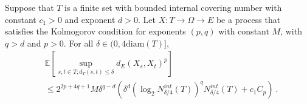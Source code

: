 \begin{theorem}\label{thm:finite_set_bound_of_dist_le_of_le_diam}
  \leanok
Suppose that $T$ is a finite set with bounded internal covering number with constant $c_1>0$ and exponent $d > 0$.
Let $X : T \to \Omega \to E$ be a process that satisfies the Kolmogorov condition for exponents $(p,q)$ with constant $M$, with $q > d$ and $p > 0$.
For all $\delta \in (0, 4\mathrm{diam}(T)]$,
\begin{align*}
  &\mathbb{E}\left[ \sup_{s, t \in T; d_T(s, t) \le \delta} d_E(X_s, X_t)^p \right]
  \\
  &\le 2^{2p+4q+1} M \delta^{q-d} \left(\delta^d \left(\log_2 N^{int}_{\delta/4}(T) \right)^q  N^{int}_{\delta/4}(T)
    + c_1 C_p\right)
  \: .
\end{align*}
\end{theorem}

